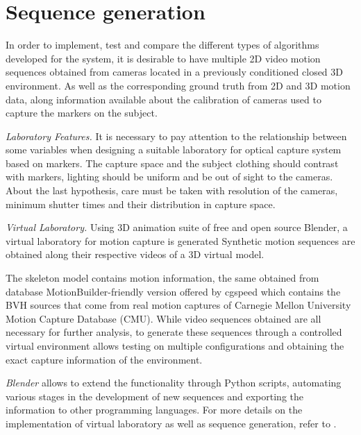 \section{Sequence generation} 
\label{section_base_de_datos}
In order to implement, test and compare the different types of algorithms developed for the system, it is desirable to have multiple 2D video motion sequences obtained from cameras located in a previously conditioned closed 3D environment. As well as the corresponding ground truth from 2D and 3D motion data, along information available about the calibration of cameras used to capture the markers on the subject.

\textit{Laboratory Features.}
\label{seccion_Caracteristicas_Laboratorio}
It is necessary to pay attention to the relationship between some variables when designing a suitable laboratory for optical capture system based on markers. The capture space and the subject clothing should contrast with markers, lighting should be uniform and be out of sight to the cameras. About the last hypothesis, care must be taken with resolution of the cameras, minimum shutter times and their distribution in capture space.

\textit{Virtual Laboratory.} Using 3D animation suite of free and open source Blender, a virtual laboratory for motion capture is generated Synthetic motion sequences are obtained along their respective videos of a 3D virtual model.

The skeleton model contains motion information, the same obtained from database MotionBuilder-friendly version offered by cgspeed which contains the BVH sources that come from real motion captures of Carnegie Mellon University Motion Capture Database (CMU). While video sequences obtained are all necessary for further analysis, to generate these sequences through a controlled virtual environment allows testing on multiple configurations and obtaining the exact capture information of the environment.

\emph{Blender} allows to extend the functionality through Python scripts, automating various stages in the development of new sequences and exporting the information to other programming languages.
For more details on the implementation of virtual laboratory as well as sequence generation, refer to \cite{proyecto_biomecanica}.
